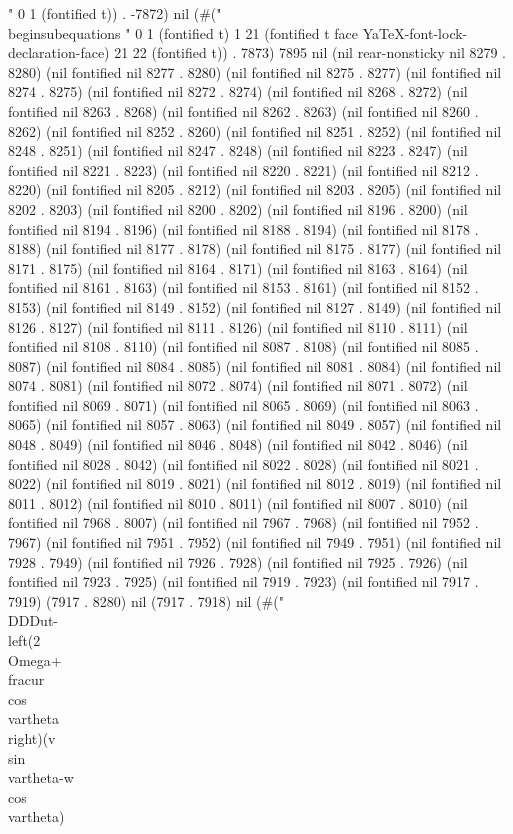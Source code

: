 " 0 1 (fontified t)) . -7872) nil (#(" \\begin{subequations} " 0 1 (fontified t) 1 21 (fontified t face YaTeX-font-lock-declaration-face) 21 22 (fontified t)) . 7873) 7895 nil (nil rear-nonsticky nil 8279 . 8280) (nil fontified nil 8277 . 8280) (nil fontified nil 8275 . 8277) (nil fontified nil 8274 . 8275) (nil fontified nil 8272 . 8274) (nil fontified nil 8268 . 8272) (nil fontified nil 8263 . 8268) (nil fontified nil 8262 . 8263) (nil fontified nil 8260 . 8262) (nil fontified nil 8252 . 8260) (nil fontified nil 8251 . 8252) (nil fontified nil 8248 . 8251) (nil fontified nil 8247 . 8248) (nil fontified nil 8223 . 8247) (nil fontified nil 8221 . 8223) (nil fontified nil 8220 . 8221) (nil fontified nil 8212 . 8220) (nil fontified nil 8205 . 8212) (nil fontified nil 8203 . 8205) (nil fontified nil 8202 . 8203) (nil fontified nil 8200 . 8202) (nil fontified nil 8196 . 8200) (nil fontified nil 8194 . 8196) (nil fontified nil 8188 . 8194) (nil fontified nil 8178 . 8188) (nil fontified nil 8177 . 8178) (nil fontified nil 8175 . 8177) (nil fontified nil 8171 . 8175) (nil fontified nil 8164 . 8171) (nil fontified nil 8163 . 8164) (nil fontified nil 8161 . 8163) (nil fontified nil 8153 . 8161) (nil fontified nil 8152 . 8153) (nil fontified nil 8149 . 8152) (nil fontified nil 8127 . 8149) (nil fontified nil 8126 . 8127) (nil fontified nil 8111 . 8126) (nil fontified nil 8110 . 8111) (nil fontified nil 8108 . 8110) (nil fontified nil 8087 . 8108) (nil fontified nil 8085 . 8087) (nil fontified nil 8084 . 8085) (nil fontified nil 8081 . 8084) (nil fontified nil 8074 . 8081) (nil fontified nil 8072 . 8074) (nil fontified nil 8071 . 8072) (nil fontified nil 8069 . 8071) (nil fontified nil 8065 . 8069) (nil fontified nil 8063 . 8065) (nil fontified nil 8057 . 8063) (nil fontified nil 8049 . 8057) (nil fontified nil 8048 . 8049) (nil fontified nil 8046 . 8048) (nil fontified nil 8042 . 8046) (nil fontified nil 8028 . 8042) (nil fontified nil 8022 . 8028) (nil fontified nil 8021 . 8022) (nil fontified nil 8019 . 8021) (nil fontified nil 8012 . 8019) (nil fontified nil 8011 . 8012) (nil fontified nil 8010 . 8011) (nil fontified nil 8007 . 8010) (nil fontified nil 7968 . 8007) (nil fontified nil 7967 . 7968) (nil fontified nil 7952 . 7967) (nil fontified nil 7951 . 7952) (nil fontified nil 7949 . 7951) (nil fontified nil 7928 . 7949) (nil fontified nil 7926 . 7928) (nil fontified nil 7925 . 7926) (nil fontified nil 7923 . 7925) (nil fontified nil 7919 . 7923) (nil fontified nil 7917 . 7919) (7917 . 8280) nil (7917 . 7918) nil (#("  \\DDD{u}{t}-\\left(2\\Omega+\\frac{u}{r\\cos\\vartheta}\\right)(v\\sin\\vartheta-w\\cos\\vartheta)
